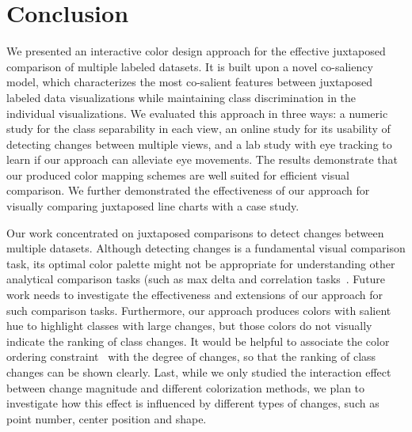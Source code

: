 \section {Conclusion}
We presented an interactive color design approach for the effective juxtaposed comparison of multiple labeled datasets.
It is built upon a novel co-saliency model, which characterizes the most co-salient features between juxtaposed labeled data visualizations while maintaining class discrimination in the individual visualizations.
We evaluated this approach in three ways: a numeric study for the class separability in each view,  an online study for its usability of detecting changes between multiple views, and a lab study with eye tracking to learn if our approach can alleviate eye movements. The results demonstrate that our produced color mapping schemes are well suited for efficient visual comparison. We further demonstrated the effectiveness of our approach for visually comparing juxtaposed line charts with a case study.


Our work concentrated on juxtaposed comparisons to detect changes between multiple datasets.
Although detecting changes is a fundamental visual comparison task, its optimal color palette might not be appropriate for understanding other analytical comparison tasks (such as max delta and correlation tasks~\cite{Ondov19}. Future work needs to investigate the effectiveness and extensions of our approach for such comparison tasks. Furthermore, our approach produces colors with salient hue to highlight classes with large changes, but those colors do not visually indicate the ranking of class changes.
It would be helpful to associate the color ordering constraint~\cite{Bujack18} with the degree of changes, so that the ranking of class changes can be shown clearly.
Last, while we only studied the interaction effect between change magnitude and different colorization methods, we plan to investigate how this effect is influenced by different types of changes, such as point number, center position and shape.
